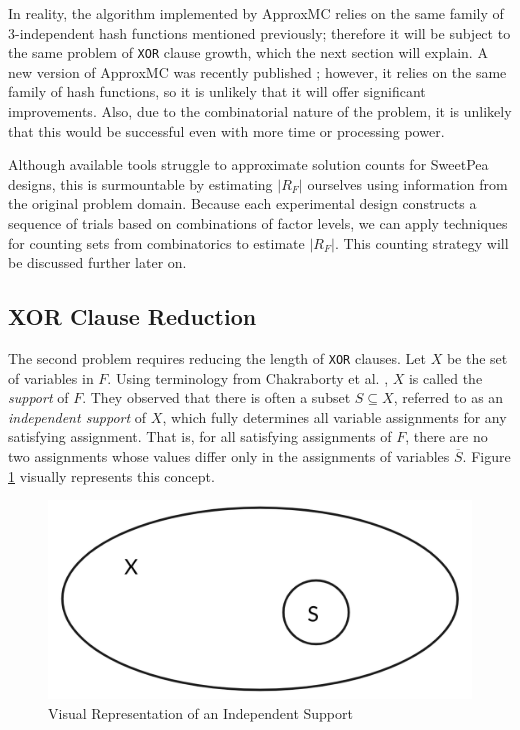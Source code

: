 In reality, the algorithm implemented by ApproxMC relies on the same family of 3-independent hash functions mentioned previously; therefore it will be subject to the same problem of \texttt{XOR} clause growth, which the next section will explain. A new version of ApproxMC was recently published \cite{approxmc_SM19}; however, it relies on the same family of hash functions, so it is unlikely that it will offer significant improvements. Also, due to the combinatorial nature of the problem, it is unlikely that this would be successful even with more time or processing power.

Although available tools struggle to approximate solution counts for SweetPea designs, this is surmountable by estimating $|R_F|$ ourselves using information from the original problem domain. Because each experimental design constructs a sequence of trials based on combinations of factor levels, we can apply techniques for counting sets from combinatorics to estimate $|R_F|$. This counting strategy will be discussed further later on.

\subsection{XOR Clause Reduction}

The second problem requires reducing the length of \texttt{XOR} clauses. Let $X$ be the set of variables in $F$. Using terminology from Chakraborty et al. \cite{chakraborty_balancing_2014}, $X$ is called the \textit{support} of $F$. They observed that there is often a subset $S \subseteq X$, referred to as an \textit{independent support} of $X$, which fully determines all variable assignments for any satisfying assignment. That is, for all satisfying assignments of $F$, there are no two assignments whose values differ only in the assignments of variables $\overline{S}$. Figure \ref{fig:ind_support} visually represents this concept.

\begin{figure}[htb]
\centering
\centerline{\includegraphics[origin=c,width=12cm]{../figures/independent-support.png}}
\caption{Visual Representation of an Independent Support}
\label{fig:ind_support}
\end{figure}

